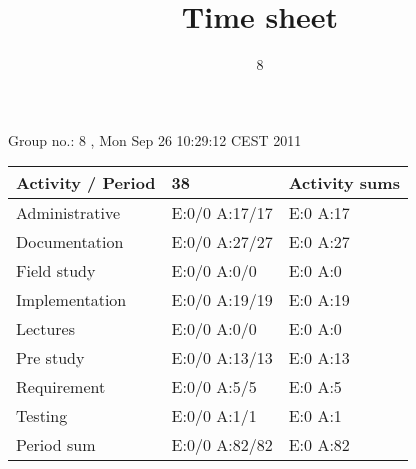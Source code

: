 \documentclass[a4paper]{article}
\title{Time sheet}
\author{8}
\begin{document}
\begin{landscape}
\begin{center}
	Group no.: 8
	, Mon Sep 26 10:29:12 CEST 2011

	\begin{tabular}{| l | l | l |}
		\hline
		Activity / Period & 38 & Activity sums \\
		\hline \hline
		
Administrative & E:0/0 A:17/17 & E:0 A:17 \\
Documentation & E:0/0 A:27/27 & E:0 A:27 \\
Field study & E:0/0 A:0/0 & E:0 A:0 \\
Implementation & E:0/0 A:19/19 & E:0 A:19 \\
Lectures & E:0/0 A:0/0 & E:0 A:0 \\
Pre study & E:0/0 A:13/13 & E:0 A:13 \\
Requirement & E:0/0 A:5/5 & E:0 A:5 \\
Testing & E:0/0 A:1/1 & E:0 A:1 \\
Period sum & E:0/0 A:82/82 & E:0 A:82 \\
		\hline
	\end{tabular}
\end{center}
\end{landscape}
\end{document}
